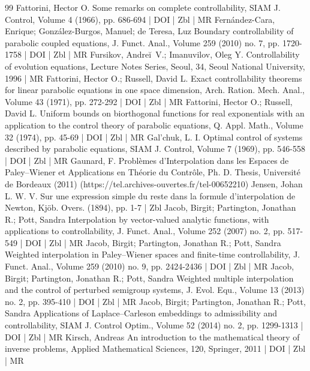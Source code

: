 \begin{thebibliography}{99}
Fattorini, Hector O. Some remarks on complete controllability, SIAM J. Control, Volume 4 (1966), pp. 686-694 | DOI | Zbl | MR
Fernández-Cara, Enrique; González-Burgos, Manuel; de Teresa, Luz Boundary controllability of parabolic coupled equations, J. Funct. Anal., Volume 259 (2010) no. 7, pp. 1720-1758 | DOI | Zbl | MR
Fursikov, Andreĭ V.; Imanuvilov, Oleg Y. Controllability of evolution equations, Lecture Notes Series, Seoul, 34, Seoul National University, 1996 | MR
Fattorini, Hector O.; Russell, David L. Exact controllability theorems for linear parabolic equations in one space dimension, Arch. Ration. Mech. Anal., Volume 43 (1971), pp. 272-292 | DOI | Zbl | MR
Fattorini, Hector O.; Russell, David L. Uniform bounds on biorthogonal functions for real exponentials with an application to the control theory of parabolic equations, Q. Appl. Math., Volume 32 (1974), pp. 45-69 | DOI | Zbl | MR
Gal’chuk, L. I. Optimal control of systems described by parabolic equations, SIAM J. Control, Volume 7 (1969), pp. 546-558 | DOI | Zbl | MR
Gaunard, F. Problèmes d’Interpolation dans les Espaces de Paley–Wiener et Applications en Théorie du Contrôle, Ph. D. Thesis, Université de Bordeaux (2011) (https://tel.archives-ouvertes.fr/tel-00652210)
Jensen, Johan L. W. V. Sur une expression simple du reste dans la formule d’interpolation de Newton, Kjöb. Overs. (1894), pp. 1-7 | Zbl
Jacob, Birgit; Partington, Jonathan R.; Pott, Sandra Interpolation by vector-valued analytic functions, with applications to controllability, J. Funct. Anal., Volume 252 (2007) no. 2, pp. 517-549 | DOI | Zbl | MR
Jacob, Birgit; Partington, Jonathan R.; Pott, Sandra Weighted interpolation in Paley–Wiener spaces and finite-time controllability, J. Funct. Anal., Volume 259 (2010) no. 9, pp. 2424-2436 | DOI | Zbl | MR
Jacob, Birgit; Partington, Jonathan R.; Pott, Sandra Weighted multiple interpolation and the control of perturbed semigroup systems, J. Evol. Equ., Volume 13 (2013) no. 2, pp. 395-410 | DOI | Zbl | MR
Jacob, Birgit; Partington, Jonathan R.; Pott, Sandra Applications of Laplace–Carleson embeddings to admissibility and controllability, SIAM J. Control Optim., Volume 52 (2014) no. 2, pp. 1299-1313 | DOI | Zbl | MR
Kirsch, Andreas An introduction to the mathematical theory of inverse problems, Applied Mathematical Sciences, 120, Springer, 2011 | DOI | Zbl | MR

\end{thebibliography}
